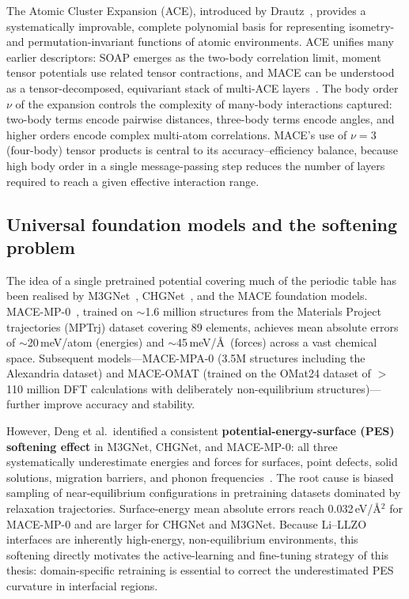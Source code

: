 \documentclass[12pt,a4paper,oneside]{book}
\begin{document}
The Atomic Cluster Expansion (ACE), introduced by Drautz~\cite{Drautz2019}, provides a systematically improvable, complete polynomial basis for representing isometry- and permutation-invariant functions of atomic environments. ACE unifies many earlier descriptors: SOAP emerges as the two-body correlation limit, moment tensor potentials use related tensor contractions, and MACE can be understood as a tensor-decomposed, equivariant stack of multi-ACE layers~\cite{Batatia2022design}. The body order $\nu$ of the expansion controls the complexity of many-body interactions captured: two-body terms encode pairwise distances, three-body terms encode angles, and higher orders encode complex multi-atom correlations. MACE's use of $\nu = 3$ (four-body) tensor products is central to its accuracy--efficiency balance, because high body order in a single message-passing step reduces the number of layers required to reach a given effective interaction range.

\subsection{Universal foundation models and the softening problem}

The idea of a single pretrained potential covering much of the periodic table has been realised by M3GNet~\cite{Chen2022}, CHGNet~\cite{Deng2023chgnet}, and the MACE foundation models. MACE-MP-0~\cite{Batatia2023foundation}, trained on $\sim$1.6 million structures from the Materials Project trajectories (MPTrj) dataset covering 89 elements, achieves mean absolute errors of $\sim$20\,meV/atom (energies) and $\sim$45\,meV/\AA\ (forces) across a vast chemical space. Subsequent models---MACE-MPA-0 (3.5M structures including the Alexandria dataset) and MACE-OMAT (trained on the OMat24 dataset of $>$110 million DFT calculations with deliberately non-equilibrium structures)---further improve accuracy and stability.

However, Deng et al.\ identified a consistent \textbf{potential-energy-surface (PES) softening effect} in M3GNet, CHGNet, and MACE-MP-0: all three systematically underestimate energies and forces for surfaces, point defects, solid solutions, migration barriers, and phonon frequencies~\cite{Deng2025}. The root cause is biased sampling of near-equilibrium configurations in pretraining datasets dominated by relaxation trajectories. Surface-energy mean absolute errors reach 0.032\,eV/\AA$^2$ for MACE-MP-0 and are larger for CHGNet and M3GNet. Because Li--LLZO interfaces are inherently high-energy, non-equilibrium environments, this softening directly motivates the active-learning and fine-tuning strategy of this thesis: domain-specific retraining is essential to correct the underestimated PES curvature in interfacial regions.
\end{document}
